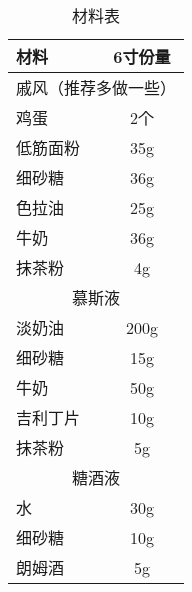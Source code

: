 \begin{table}[h]
    \centering
    \begin{tabular}{|l||c|}\hline
     \textbf{材料}    &  \textbf{6寸份量}\\ \hline\hline
    \multicolumn{2}{|c|}{戚风（推荐多做一些）}\\ \hline
    鸡蛋     &  2个 \\ \hline
    低筋面粉     &  35g \\ \hline
    细砂糖  & 36g  \\ \hline
    色拉油 &  25g  \\ \hline
    牛奶     &  36g \\ \hline
    抹茶粉     & 4g  \\ \hline
    \multicolumn{2}{|c|}{慕斯液}\\ \hline
    淡奶油     &  200g \\ \hline
    细砂糖     &  15g \\ \hline
    牛奶     &  50g \\ \hline
    吉利丁片     &  10g \\ \hline
    抹茶粉     &  5g \\ \hline
    \multicolumn{2}{|c|}{糖酒液}\\ \hline
    水     &  30g \\ \hline
    细砂糖     &  10g \\ \hline
    朗姆酒     &  5g \\ \hline
    \end{tabular}
    \caption{材料表}
\end{table}

